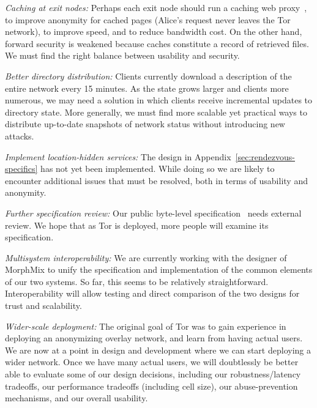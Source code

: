 \documentclass[times,10pt,twocolumn]{article}
\begin{document}

\emph{Caching at exit nodes:} Perhaps each exit node should run a
caching web proxy~\cite{shsm03}, to improve anonymity for cached pages
(Alice's request never
leaves the Tor network), to improve speed, and to reduce bandwidth cost.
On the other hand, forward security is weakened because caches
constitute a record of retrieved files.  We must find the right
balance between usability and security.

\emph{Better directory distribution:}
Clients currently download a description of
the entire network every 15 minutes. As the state grows larger
and clients more numerous, we may need a solution in which
clients receive incremental updates to directory state.
More generally, we must find more
scalable yet practical ways to distribute up-to-date snapshots of
network status without introducing new attacks.

\emph{Implement location-hidden services:} The design in
Appendix~\ref{sec:rendezvous-specifics} has not yet been implemented.
While doing
so we are likely to encounter additional issues that must be resolved,
both in terms of usability and anonymity.

\emph{Further specification review:} Our public
byte-level specification~\cite{tor-spec} needs
external review.  We hope that as Tor
is deployed, more people will examine its
specification.

\emph{Multisystem interoperability:} We are currently working with the
designer of MorphMix to unify the specification and implementation of
the common elements of our two systems. So far, this seems
to be relatively straightforward.  Interoperability will allow testing
and direct comparison of the two designs for trust and scalability.

\emph{Wider-scale deployment:} The original goal of Tor was to
gain experience in deploying an anonymizing overlay network, and
learn from having actual users.  We are now at a point in design
and development where we can start deploying a wider network.  Once
we have many actual users, we will doubtlessly be better
able to evaluate some of our design decisions, including our
robustness/latency tradeoffs, our performance tradeoffs (including
cell size), our abuse-prevention mechanisms, and
our overall usability.
\end{document}
